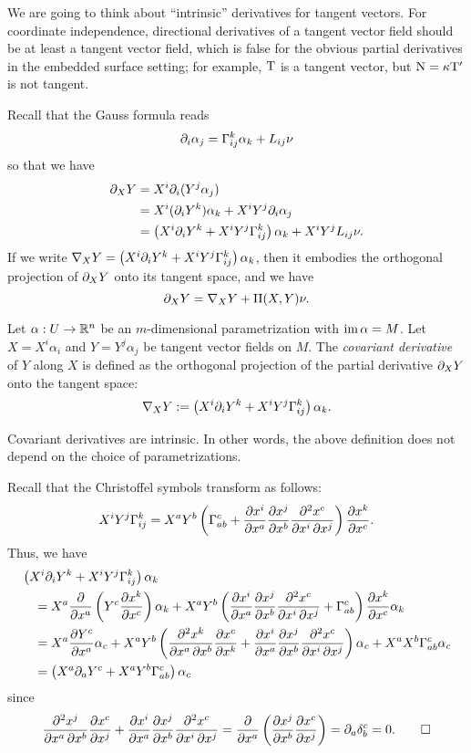 \documentclass{../../large}
\renewcommand{\a}{\alpha}
\newcommand{\II}{\mathrm{II}}
\begin{document}



\begin{prb}
We are going to think about ``intrinsic'' derivatives for tangent vectors.
For coordinate independence, directional derivatives of a tangent vector field should be at least a tangent vector field, which is false for the obvious partial derivatives in the embedded surface setting; for example, $\mathrm{T}$ is a tangent vector, but $\mathrm{N}=\kappa\mathrm{T}'$ is not tangent.

Recall that the Gauss formula reads
\[\pd_i\a_j=\Gamma_{ij}^k\a_k+L_{ij}\nu\]
so that we have
\begin{align*}
\pd_XY
&=X^i\pd_i(Y^j\a_j)\\
&=X^i(\pd_iY^k)\a_k+X^iY^j\pd_i\a_j\\
&=\left(X^i\pd_iY^k+X^iY^j\Gamma_{ij}^k\right)\a_k+X^iY^jL_{ij}\nu.
\end{align*}
If we write $\nabla_XY=\left(X^i\pd_iY^k+X^iY^j\Gamma_{ij}^k\right)\a_k$, then it embodies the orthogonal projection of $\pd_XY$ onto its tangent space, and we have
\[\pd_XY=\nabla_XY+\II(X,Y)\nu.\]

Let $\a:U\to\R^n$ be an $m$-dimensional parametrization with $\im\a=M$.
Let $X=X^i\a_i$ and $Y=Y^j\a_j$ be tangent vector fields on $M$.
The \emph{covariant derivative} of $Y$ along $X$ is defined as the orthogonal projection of the partial derivative $\pd_XY$ onto the tangent space:
\[\nabla_XY:=\left(X^i\pd_iY^k+X^iY^j\Gamma_{ij}^k\right)\a_k.\]
\begin{parts}
\item
Covariant derivatives are intrinsic.
In other words, the above definition does not depend on the choice of parametrizations.
\end{parts}
\end{prb}
\begin{pf}
Recall that the Christoffel symbols transform as follows:
\[X^iY^j\Gamma_{ij}^k=X^aY^b\left(\Gamma_{ab}^c+\pd{x^i}{x^a}\pd{x^j}{x^b}\pd[2]{x^c}{x^i}{x^j}\right)\pd{x^k}{x^c}.\]
Thus, we have
\begin{align*}
&\left(X^i\pd_iY^k+X^iY^j\Gamma_{ij}^k\right)\a_k\\
&\quad=X^a\pd{x^a}\left(Y^c\pd{x^k}{x^c}\right)\a_k+X^aY^b\left(\pd{x^i}{x^a}\pd{x^j}{x^b}\pd[2]{x^c}{x^i}{x^j}+\Gamma_{ab}^c\right)\pd{x^k}{x^c}\a_k\\
&\quad=X^a\pd{Y^c}{x^a}\a_c+X^aY^b\left(\pd[2]{x^k}{x^a}{x^b}\pd{x^c}{x^k}+\pd{x^i}{x^a}\pd{x^j}{x^b}\pd[2]{x^c}{x^i}{x^j}\right)\a_c+X^aX^b\Gamma_{ab}^c\a_c\\
&\quad=\left(X^a\pd_aY^c+X^aY^b\Gamma_{ab}^c\right)\a_c
\end{align*}
since
\[\pd[2]{x^j}{x^a}{x^b}\pd{x^c}{x^j}+\pd{x^i}{x^a}\pd{x^j}{x^b}\pd[2]{x^c}{x^i}{x^j}=\pd{x^a}\left(\pd{x^j}{x^b}\pd{x^c}{x^j}\right)=\pd_a\delta_b^c=0.\qedhere\]
\end{pf}
\end{document}
